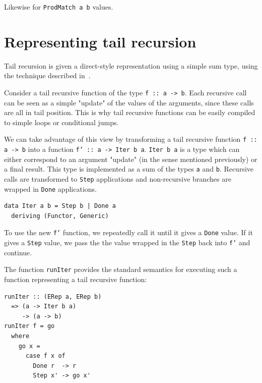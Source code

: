 \documentclass[sigplan,anonymous,review]{acmart}
\newcommand{\ttt}{\texttt}
\newcommand{\showtodos}{}  %
\newenvironment{todo}
  {\ifthenelse{\isundefined{\showtodos}}{\comment}{\begin{tcolorbox}
    \textbf{TODO}:}}
  {\ifthenelse{\isundefined{\showtodos}}{\endcomment}{\end{tcolorbox}}
  }
\begin{document}
Likewise for \ttt{ProdMatch a b} values.

\section{Representing tail recursion}
Tail recursion is given a direct-style representation using a simple sum type,
using the technique described in~\cite{Grebe:2017:RSD:3136040.3136048}.

Consider a tail recursive function of the type \ttt{f :: a -> b}. Each recursive
call can be seen as a simple "update" of the values of the arguments, since
these calls are all in tail position. This is why tail recursive functions
can be easily compiled to simple loops or conditional jumps.

We can take advantage of this view by transforming a tail recursive function
\ttt{f :: a -> b} into a function \ttt{f' :: a -> Iter b a}. \ttt{Iter b a} is a
type which can either correspond to an argument "update" (in the sense mentioned
previously) or a final result. This type is implemented as a sum of the types
\ttt{a} and \ttt{b}. Recursive calls are transformed to \ttt{Step} applications
and non-recursive branches are wrapped in \ttt{Done} applications.

\begin{lstlisting}
data Iter a b = Step b | Done a
  deriving (Functor, Generic)
\end{lstlisting}

To use the new \ttt{f'} function, we repeatedly call it until it gives a
\ttt{Done} value. If it gives a \ttt{Step} value, we pass the the value wrapped
in the \ttt{Step} back into \ttt{f'} and continue.

The function \ttt{runIter} provides the standard semantics for executing such a
function representing a tail recursive function:

\begin{lstlisting}
runIter :: (ERep a, ERep b)
  => (a -> Iter b a)
     -> (a -> b)
runIter f = go
  where
    go x =
      case f x of
        Done r  -> r
        Step x' -> go x'
\end{lstlisting}


\end{document}
